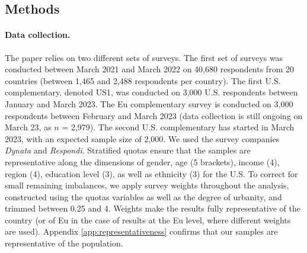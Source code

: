 \begin{small} %
\section*{\normalsize Methods}\label{sec:methods} %
\paragraph{\small Data collection.} %
The paper relies on two different sets of surveys. The first set of surveys was conducted between March 2021 and March 2022 on 40,680 respondents from 20 countries  (between 1,465 and 2,488 respondents per country). The first U.S. complementary, denoted US1, was conducted on 3,000 U.S. respondents between January and March 2023. The Eu complementary survey is conducted on 3,000 respondents between February and March 2023 (data collection is still ongoing on March 23, as $n$ = 2,979). The second U.S. complementary has started in March 2023, with an expected sample size of 2,000. 
We used the survey companies \emph{Dynata} and \emph{Respondi}. Stratified quotas ensure that the samples are representative along the dimensions of gender, age (5 brackets), income (4), region (4), education level (3), as well as ethnicity (3) for the U.S. %
To correct for small remaining imbalances, we apply survey weights throughout the analysis, constructed using the quotas variables as well as the degree of urbanity, and trimmed between 0.25 and 4. Weights make the results fully representative of the country (or of Eu in the case of results at the Eu level, where different weights are used). %
Appendix \ref{app:representativeness} confirms that our samples are representative of the population.


\end{small}
